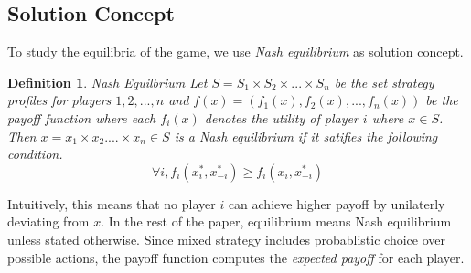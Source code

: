 \documentclass[11pt]{article}
\theoremstyle{plain}
\newtheorem*{definition}{Definition}
\begin{document}
\subsection{Solution Concept}
To study the equilibria of the game, we use \textit{Nash equilibrium} %
as solution concept. %

\begin{definition}{Nash Equilbrium}
Let $S= S_1 \times S_2 \times ... \times S_n$ be the set strategy profiles for players $1,2,...,n$
and $f(x)=(f_1(x),f_2(x),...,f_n(x))$ be the payoff function where each $f_i(x)$ denotes the utility of player $i$ where $x \in S$.
Then $x = x_1 \times x_2.... \times x_n \in S$
is a Nash equilibrium if it satifies the following condition.
$$\forall i, f_i(x^*_i,x^*_{-i}) \ge f_i(x_i,x^*_{-i})  $$


\end{definition}
Intuitively, this means that no player $i$ can achieve higher payoff by unilaterly deviating from $x$.
In the rest of the paper, equilibrium means {Nash equilibrium} unless stated otherwise. Since mixed strategy includes probablistic choice over possible actions, the payoff function computes the \textit{expected payoff} for each player.
\end{document}
